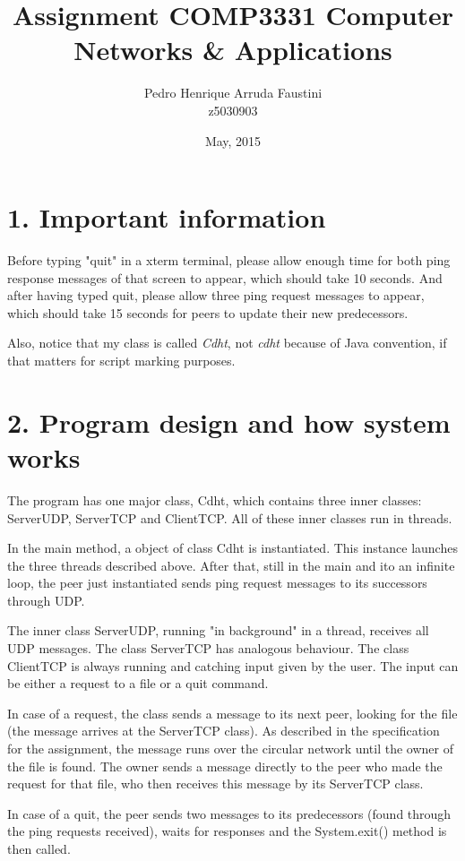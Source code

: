\documentclass[a4paper,11pt]{report}
\title{Assignment COMP3331 Computer Networks \& Applications}
\author{Pedro Henrique Arruda Faustini \\ z5030903}
\date{May, 2015}
\affil{University of New South Wales, Australia}
\begin{document}
\maketitle

\section*{1. Important information}
        Before typing "quit" in a xterm terminal, please allow enough time for both ping response messages of that screen to appear, which should take 10 seconds. And after having typed quit, please allow three ping request messages to appear, which should take 15 seconds for peers to update their new predecessors.
        
        Also, notice that my class is called \textit{Cdht}, not \textit{cdht} because of Java convention, if that matters for script marking purposes.
        
\section*{2. Program design and how system works}
        The program has one major class, Cdht, which contains three inner classes: ServerUDP, ServerTCP and ClientTCP. All of these inner classes run in threads.
        
        In the main method, a object of class Cdht is instantiated. This instance launches the three threads described above. After that, still in the main and ito an infinite loop, the peer just instantiated sends ping request messages to its successors through UDP. 
        
        The inner class ServerUDP, running "in background" in a thread, receives all UDP messages. The class ServerTCP has analogous behaviour. The class ClientTCP is always running and catching input given by the user. The input can be either a request to a file or a quit command.
        
        In case of a request, the class sends a message to its next peer, looking for the file (the message arrives at the ServerTCP class). As described in the specification for the assignment, the message runs over the circular network until the owner of the file is found. The owner sends a message directly to the peer who made the request for that file, who then receives this message by its ServerTCP class.
        
        In case of a quit, the peer sends two messages to its predecessors (found through the ping requests received), waits for responses and the System.exit() method is then called.       
\end{document}

